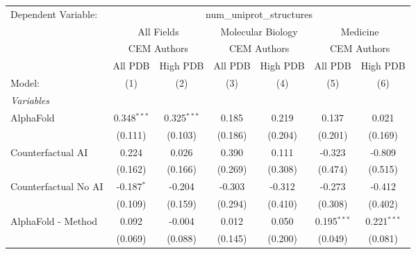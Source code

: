 \begingroup
\centering
\begin{tabular}{lcccccc}
   \tabularnewline \midrule \midrule
   Dependent Variable: & \multicolumn{6}{c}{num\_uniprot\_structures}\\
 & \multicolumn{2}{c}{All Fields} & \multicolumn{2}{c}{Molecular Biology} & \multicolumn{2}{c}{Medicine} \\
\cmidrule(lr){2-3} \cmidrule(lr){4-5} \cmidrule(lr){6-7}
 & \multicolumn{2}{c}{CEM Authors} & \multicolumn{2}{c}{CEM Authors} & \multicolumn{2}{c}{CEM Authors} \\
\cmidrule(lr){2-3} \cmidrule(lr){4-5} \cmidrule(lr){6-7}
 & \multicolumn{1}{c}{All PDB} & \multicolumn{1}{c}{High PDB} & \multicolumn{1}{c}{All PDB} & \multicolumn{1}{c}{High PDB} & \multicolumn{1}{c}{All PDB} & \multicolumn{1}{c}{High PDB} \\
\cmidrule(lr){2-2} \cmidrule(lr){3-3} \cmidrule(lr){4-4} \cmidrule(lr){5-5} \cmidrule(lr){6-6} \cmidrule(lr){7-7}
   Model:                                                     & (1)           & (2)           & (3)     & (4)     & (5)            & (6)\\  
   \midrule
   \emph{Variables}\\
   AlphaFold                                                  & 0.348$^{***}$ & 0.325$^{***}$ & 0.185   & 0.219   & 0.137          & 0.021\\   
                                                              & (0.111)       & (0.103)       & (0.186) & (0.204) & (0.201)        & (0.169)\\   
   Counterfactual AI                                          & 0.224         & 0.026         & 0.390   & 0.111   & -0.323         & -0.809\\   
                                                              & (0.162)       & (0.166)       & (0.269) & (0.308) & (0.474)        & (0.515)\\   
   Counterfactual No AI                                       & -0.187$^{*}$  & -0.204        & -0.303  & -0.312  & -0.273         & -0.412\\   
                                                              & (0.109)       & (0.159)       & (0.294) & (0.410) & (0.308)        & (0.402)\\   
   AlphaFold - Method                                         & 0.092         & -0.004        & 0.012   & 0.050   & 0.195$^{***}$  & 0.221$^{***}$\\   
                                                              & (0.069)       & (0.088)       & (0.145) & (0.200) & (0.049)        & (0.081)\\   

\end{tabular}
